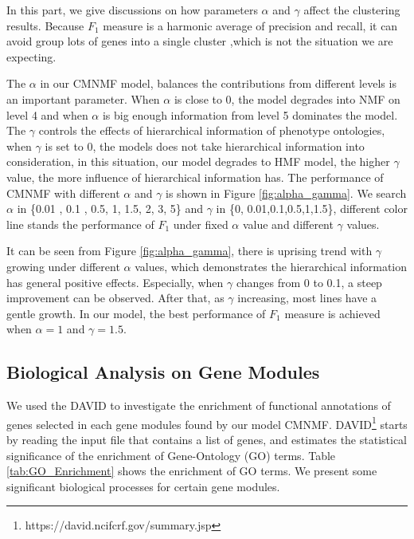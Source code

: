 \documentclass{bmcart}
\begin{document}
In this part, we give discussions on how parameters $\alpha$ and $\gamma$ affect the clustering results. Because $F_1$ measure is a  harmonic average of precision and recall, it can avoid group lots of genes into a single cluster ,which is not the situation we are expecting.

The $\alpha$ in our CMNMF model, balances the contributions from different levels is an important parameter. When $\alpha$ is close to 0, the model degrades into NMF on level 4 and when $\alpha$ is big enough information from level 5 dominates the model. The $\gamma$ controls the effects of hierarchical information of phenotype ontologies, when $\gamma$ is set to 0, the models does not take hierarchical information into consideration, in this situation, our model degrades to HMF model, the higher $\gamma$ value, the more influence of hierarchical information has.
 The performance of CMNMF with different $\alpha$ and $\gamma$ is shown in Figure \ref{fig:alpha_gamma}. We search $\alpha$ in \{0.01 , 0.1 , 0.5, 1, 1.5, 2, 3, 5\} and $\gamma$ in \{0, 0.01,0.1,0.5,1,1.5\}, different color line stands the performance of $F_1$ under fixed $\alpha$ value and different $\gamma$ values.

It can be seen from Figure \ref{fig:alpha_gamma}, there is uprising trend with $\gamma$ growing under different $\alpha$ values, which demonstrates the hierarchical information has general positive effects. Especially, when $\gamma$ changes from 0 to 0.1, a steep improvement can be observed. After that, as $\gamma$ increasing, most lines have a gentle growth. In our model, the best performance of $F_1$ measure is achieved when $\alpha=1$ and $\gamma = 1.5$.

\subsection*{\textbf{Biological Analysis on Gene Modules}}%

We used the DAVID\cite{Dennis2003} to investigate the enrichment of functional annotations of genes selected in each gene modules found by our model CMNMF. DAVID\footnote{https://david.ncifcrf.gov/summary.jsp} starts by reading the input file that contains a list of genes, and estimates the statistical significance of the enrichment of Gene-Ontology (GO) terms.
Table \ref{tab:GO_Enrichment} shows the enrichment of GO terms. We present some significant biological processes for certain  gene modules.
\end{document}
